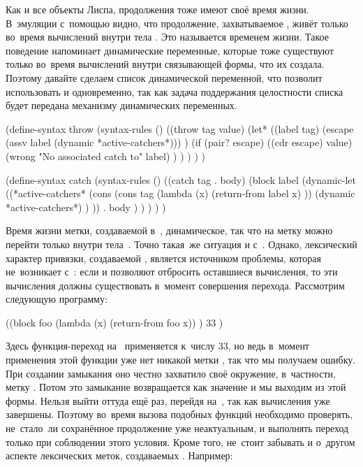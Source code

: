 Как и все объекты Лиспа, продолжения тоже имеют своё время жизни. В~эмуляции
 с~помощью  видно, что продолжение, захватываемое
, живёт только во~время вычислений внутри тела . Это
называется  временем жизни. Такое поведение напоминает
динамические переменные, которые тоже существуют только во~время вычислений
внутри связывающей формы, что их создала. Поэтому давайте сделаем список
 динамической переменной, что позволит использовать
 и  одновременно, так как задача поддержания целостности
списка будет передана механизму динамических переменных.

\begin{code:lisp}
(define-syntax throw
  (syntax-rules ()
    ((throw tag value)
     (let* ((label tag)
            (escape (assv label (dynamic *active-catchers*))) )
       (if (pair? escape)
           ((cdr escape) value)
           (wrong "No associated catch to" label) ) ) ) ) )

(define-syntax catch
  (syntax-rules ()
    ((catch tag . body)
     (block label
       (dynamic-let ((*active-catchers*
                      (cons (cons tag (lambda (x)
                                        (return-from label x) ))
                            (dynamic *active-catchers*) ) ))
        . body ) ) ) ) )
\end{code:lisp}

Время жизни метки, создаваемой  в~{\CommonLisp}, динамическое, так что
на метку можно перейти только внутри тела~. Точно такая~же ситуация
и с~. Однако, лексический характер привязки, создаваемой ,
является источником проблемы, которая не~возникает с~: если 
и  позволяют отбросить оставшиеся вычисления, то эти вычисления
должны существовать в~момент совершения перехода. Рассмотрим следующую
программу:

\begin{code:lisp}
((block foo
   (lambda (x) (return-from foo x)) )
 33 )
\end{code:lisp}

Здесь функция-переход на~ применяется к~числу 33, но ведь в~момент
применения этой функции уже нет никакой метки , так что мы получаем
ошибку. При создании замыкания оно честно захватило своё окружение, в~частности,
метку . Потом это замыкание возвращается как значение  и мы
выходим из этой формы. Нельзя выйти оттуда ещё раз, перейдя на~, так как
вычисления уже завершены. Поэтому во~время вызова подобных функций необходимо
проверять, не~стало~ли сохранённое продолжение уже неактуальным, и выполнять
переход только при соблюдении этого условия. Кроме того, не~стоит забывать и
о~другом аспекте лексических меток, создаваемых . Например:

